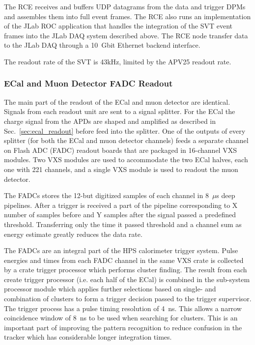 The RCE receives and buffers UDP datagrams from the data and trigger DPMs and
 assembles them into full event frames. The RCE also runs an implementation of the JLab ROC application that handles the integration of the SVT event frames into the JLab DAQ 
 system described above. The RCE node transfer data to the JLab DAQ  
 through a 10~Gbit Ethernet backend interface. 

The readout rate of the SVT is 43kHz, limited by the APV25 readout rate. 







\subsubsection{ECal and Muon Detector FADC Readout}
\label{sec:fadc_daq}
The main part of the readout of the ECal and muon detector are identical. Signals from each 
readout unit are sent to a signal splitter. For the ECal the charge signal from the APDs are 
shaped and amplified as described in Sec.~\ref{sec:ecal_readout} before feed into the 
splitter. One of the outputs of every splitter (for both the ECal and muon detector channels) 
feeds a separate channel on Flash ADC (FADC) readout boards that are packaged in 
16-channel VXS modules. Two VXS modules are used to accommodate the two ECal 
halves, each one with 221 channels, and a single VXS module is used to readout the muon 
detector. 

The FADCs stores the 12-but digitized samples of each channel in 8~$\mu$s deep pipelines. 
After a trigger is received a part of the pipeline corresponding to X number of samples 
before and Y samples after the signal passed a predefined threshold. Transferring only 
the time it passed threshold and a channel sum as energy estimate greatly reduces the data rate. 


The FADCs are an integral part of the HPS calorimeter trigger system. Pulse energies 
and times from each FADC channel in the same VXS crate is collected by a crate trigger
 processor which performs cluster finding. The result from each create trigger processor (i.e. each half of 
the ECal) is combined in the sub-system processor module which applies further selections 
based on single- and combination of clusters to form a trigger decision passed to the trigger 
supervisor. The trigger process has a pulse timing resolution of 4~ns. This allows a narrow 
coincidence window of 8~ns to be used when searching for clusters. 
This is an important part of improving 
the pattern recognition to reduce confusion in the tracker which has considerable longer 
integration times. 


